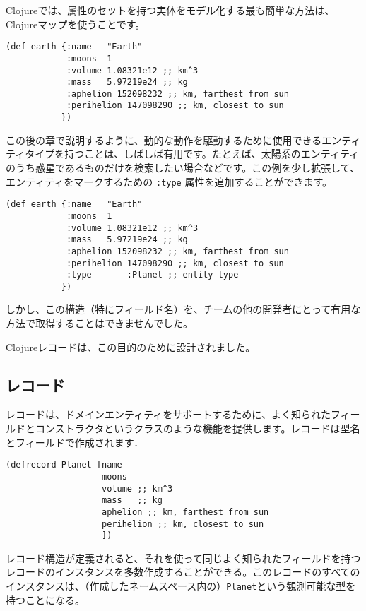 Clojureでは、属性のセットを持つ実体をモデル化する最も簡単な方法は、Clojureマップを使うことです。

\begin{lstlisting}[numbers=none]
(def earth {:name   "Earth"
            :moons  1
            :volume 1.08321e12 ;; km^3
            :mass   5.97219e24 ;; kg
            :aphelion 152098232 ;; km, farthest from sun
            :perihelion 147098290 ;; km, closest to sun
           })
\end{lstlisting}

この後の章で説明するように、動的な動作を駆動するために使用できるエンティティタイプを持つことは、しばしば有用です。たとえば、太陽系のエンティティのうち惑星であるものだけを検索したい場合などです。この例を少し拡張して、エンティティをマークするための \texttt{:type} 属性を追加することができます。


\begin{lstlisting}[numbers=none]
(def earth {:name   "Earth"
            :moons  1
            :volume 1.08321e12 ;; km^3
            :mass   5.97219e24 ;; kg
            :aphelion 152098232 ;; km, farthest from sun
            :perihelion 147098290 ;; km, closest to sun
            :type       :Planet ;; entity type
           })
\end{lstlisting}


しかし、この構造（特にフィールド名）を、チームの他の開発者にとって有用な方法で取得することはできませんでした。

Clojureレコードは、この目的のために設計されました。


\subsection{レコード}

レコードは、ドメインエンティティをサポートするために、よく知られたフィールドとコンストラクタというクラスのような機能を提供します。レコードは型名とフィールドで作成されます．


\begin{lstlisting}[numbers=none]
(defrecord Planet [name
                   moons
                   volume ;; km^3
                   mass   ;; kg
                   aphelion ;; km, farthest from sun
                   perihelion ;; km, closest to sun
                   ])
\end{lstlisting}


レコード構造が定義されると、それを使って同じよく知られたフィールドを持つレコードのインスタンスを多数作成することができる。このレコードのすべてのインスタンスは、（作成したネームスペース内の）\texttt{Planet}という観測可能な型を持つことになる。

